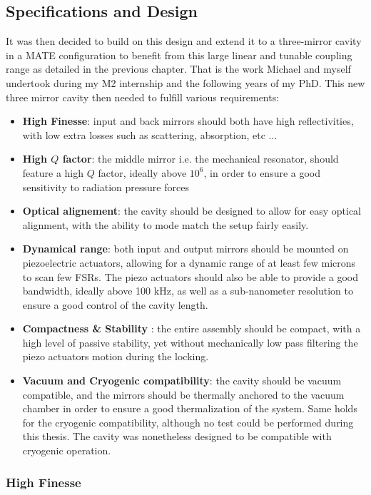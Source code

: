 \subsection{Specifications and Design}
It was then decided to build on this design and extend it to a three-mirror cavity in a MATE configuration to benefit from this large linear and tunable coupling range as detailed in the previous chapter. That is the work Michael and myself undertook during my M2 internship and the following years of my PhD.
This new three mirror cavity then needed to fulfill various requirements: 
\begin{itemize}
    \item \textbf{High Finesse}: input and back mirrors should both have high reflectivities, with low extra losses such as scattering, absorption, etc ...\cite{AmatoPhD}
    \item \textbf{High $Q$ factor}: the middle mirror i.e. the mechanical resonator, should feature a high $Q$ factor, ideally above $10^6$, in order to ensure a good sensitivity to radiation pressure forces\cite{SiN_review}
    \item \textbf{Optical alignement}: the cavity should be designed to allow for easy optical alignment, with the ability to mode match the setup fairly easily.
    \item \textbf{Dynamical range}: both input and output mirrors should be mounted on piezoelectric actuators, allowing for a dynamic range of at least few microns to scan few FSRs. The piezo actuators should also be able to provide a good bandwidth, ideally above 100 kHz, as well as a sub-nanometer resolution to ensure a good control of the cavity length\cite{piezo_review}.
    \item \textbf{Compactness \& Stability }: the entire assembly should be compact, with a high level of passive stability, yet without mechanically low pass filtering the piezo actuators motion during the locking. 
    \item \textbf{Vacuum and Cryogenic compatibility}: the cavity should be vacuum compatible, and the mirrors should be thermally anchored to the vacuum chamber in order to ensure a good thermalization of the system. Same holds for the cryogenic compatibility, although no test could be performed during this thesis. The cavity was nonetheless designed to be compatible with cryogenic operation.
\end{itemize}
\subsubsection{High Finesse}

